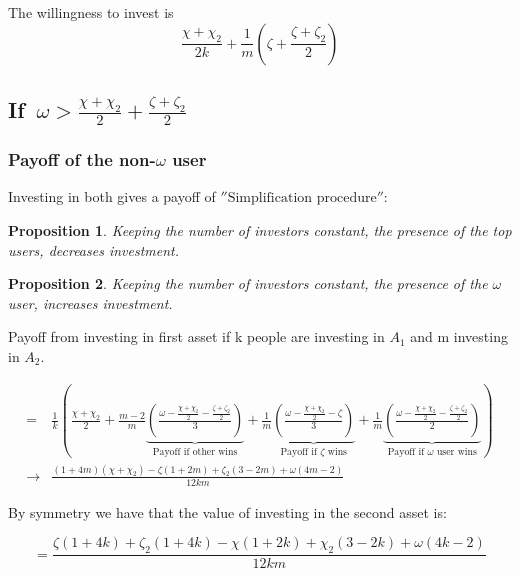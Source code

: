 \documentclass{article}
\newtheorem{proposition}{Proposition}
\begin{document}
The willingness to invest is 
\begin{equation}
\frac{\chi+\chi_2}{2k} + \frac{1}{m}\left(\zeta+\frac{\zeta+\zeta_2}{2}  \right)
\end{equation}


\subsection{If~$\omega>\frac{\chi+\chi_{2}}{2}+\frac{\zeta+\zeta_{2}}{2}$}
\subsubsection{Payoff of the non-$\omega$ user}

Investing in both gives a payoff of $\hyperref[ROB]{''\text{Simplification procedure}''}$: 

\begin{proposition}  
Keeping the number of investors constant, the presence of the top users, decreases investment. 
\end{proposition}

\begin{proposition}
Keeping the number of investors constant, the presence of the $\omega$ user, increases investment. 
\end{proposition}

Payoff from investing in first asset if k people are investing in $A_1$ and m investing in $A_2$.

\begin{align*}
 =
& \frac{1}{k}
\left(
\frac{\chi+\chi_{2}}{2}
+
\frac{m-2}{m}
\underbrace{
\left(
\frac{\omega-\frac{\chi+\chi_{2}}{2}-\frac{\zeta+\zeta_{2}}{2}}{3}
\right)
}_{\text{Payoff if other wins}} 
+
\frac{1}{m}
\underbrace{
\left
(\frac{\omega-\frac{\chi+\chi_2}{2}-\zeta}{3}
\right)
}_{\text{Payoff if $\zeta$ wins}} 
+ 
\frac{1}{m}
\underbrace{
\left
(\frac{\omega-\frac{\chi+\chi_{2}}{2}-\frac{\zeta+\zeta_{2}}{2}}{2}
\right) 
}_{\text{Payoff if $\omega$ user wins}} 
\right)
\\
\rightarrow 
&\frac{(1+4m)(\chi+\chi_2)-\zeta(1+2m)+\zeta_2(3-2m)+\omega(4m-2)}{12km}
\end{align*}

By symmetry we have that the value of investing in the second asset is: 

\begin{equation*}
=\frac{\zeta(1+4k)+\zeta_2(1+4k)-\chi(1+2k)+\chi_2(3-2k)+\omega(4k-2)}{12km}
\end{equation*}
\end{document}
